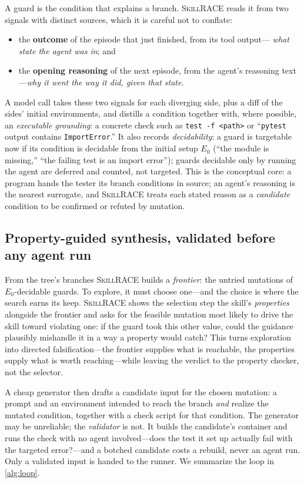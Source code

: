 \documentclass[acmsmall,screen,review,anonymous]{acmart}
\newcommand{\tool}{\textsc{SkillRACE}\xspace}
\begin{document}
A guard is the condition that explains a branch. \tool reads it from two signals with
distinct sources, which it is careful not to conflate:
\begin{itemize}[itemsep=1pt,topsep=2pt]
  \item the \textbf{outcome} of the episode that just finished, from its tool output---%
  \emph{what state the agent was in}; and
  \item the \textbf{opening reasoning} of the next episode, from the agent's reasoning
  text---\emph{why it went the way it did, given that state}.
\end{itemize}
A model call takes these two signals for each diverging side, plus a diff of the sides'
initial environments, and distills a condition together with, where possible, an
\emph{executable grounding}: a concrete check such as \texttt{test -f <path>} or
``\texttt{pytest} output contains \texttt{ImportError}.'' It also records
\emph{decidability}: a guard is targetable now if its condition is decidable from the
initial setup \(E_0\) (``the module is missing,'' ``the failing test is an import
error''); guards decidable only by running the agent are deferred and counted, not
targeted. This is the conceptual core: a program hands the tester its branch conditions
in source; an agent's reasoning is the nearest surrogate, and \tool treats each stated
reason as a \emph{candidate} condition to be confirmed or refuted by mutation.

\subsection{Property-guided synthesis, validated before any agent run}
\label{sec:synth}

From the tree's branches \tool builds a \emph{frontier}: the untried mutations of
\(E_0\)-decidable guards. To explore, it must choose one---and the choice is where the
search earns its keep. \tool shows the selection step the skill's \emph{properties}
alongside the frontier and asks for the feasible mutation most likely to drive the skill
toward violating one: if the guard took this other value, could the guidance plausibly
mishandle it in a way a property would catch? This turns exploration into directed
falsification---the frontier supplies what is reachable, the properties supply what is
worth reaching---while leaving the verdict to the property checker, not the selector.

A cheap generator then drafts a candidate input for the chosen mutation: a prompt and an
environment intended to reach the branch \emph{and} realize the mutated condition,
together with a check script for that condition. The generator may be unreliable; the
\emph{validator} is not. It builds the candidate's container and runs the check with no
agent involved---does the test it set up actually fail with the targeted error?---and a
botched candidate costs a rebuild, never an agent run. Only a validated input is handed
to the runner. We summarize the loop in \cref{alg:loop}.
\end{document}

